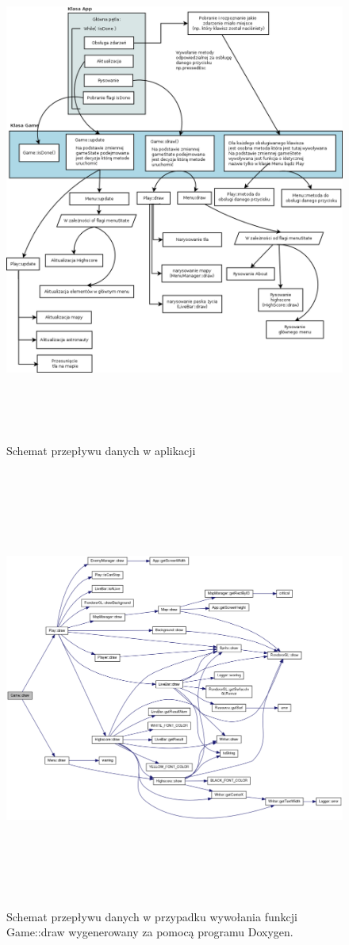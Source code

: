  \hfill
\begin{figure}[h]
    \centering
    \includegraphics[width=450px,height=630px]{./Pictures/warstwy.png}
    \caption{Schemat przepływu danych w aplikacji}
\end{figure}

 \hfill
\begin{figure}[h]
    \centering
    \includegraphics[width=460px,height=550px]{./Pictures/doxygen1.png}
    \caption{Schemat przepływu danych w przypadku wywołania funkcji Game::draw wygenerowany za pomocą programu Doxygen.}
\end{figure}



